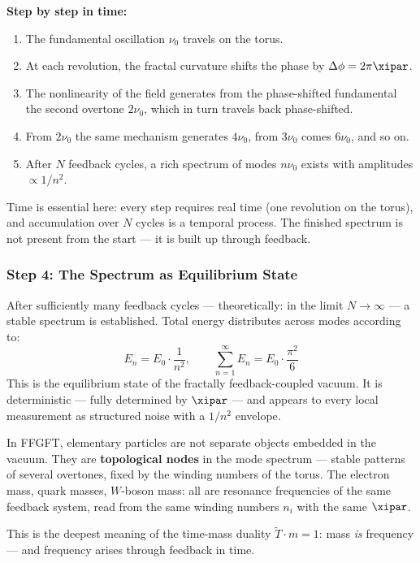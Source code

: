 \begin{keypoint}
\textbf{Step by step in time:}
\begin{enumerate}
    \item The fundamental oscillation $\nu_0$ travels on the torus.
    \item At each revolution, the fractal curvature shifts the phase by
    $\Delta\phi = 2\pi\xipar$.
    \item The nonlinearity of the field generates from the phase-shifted fundamental
    the second overtone $2\nu_0$, which in turn travels back phase-shifted.
    \item From $2\nu_0$ the same mechanism generates $4\nu_0$, from $3\nu_0$
    comes $6\nu_0$, and so on.
    \item After $N$ feedback cycles, a rich spectrum of modes $n\nu_0$ exists
    with amplitudes $\propto 1/n^2$.
\end{enumerate}
Time is essential here: every step requires real time (one revolution on the
torus), and accumulation over $N$ cycles is a temporal process. The finished
spectrum is not present from the start — it is built up through feedback.
\end{keypoint}

\subsubsection*{Step 4: The Spectrum as Equilibrium State}

After sufficiently many feedback cycles — theoretically: in the limit
$N \to \infty$ — a stable spectrum is established. Total energy distributes
across modes according to:
\begin{equation}
    E_n = E_0 \cdot \frac{1}{n^2}, \qquad \sum_{n=1}^{\infty} E_n = E_0 \cdot \frac{\pi^2}{6}
\end{equation}
This is the equilibrium state of the fractally feedback-coupled vacuum. It is
deterministic — fully determined by $\xipar$ — and appears to every local
measurement as structured noise with a $1/n^2$ envelope.

\begin{interpretation}
In FFGFT, elementary particles are not separate objects embedded in the vacuum.
They are \textbf{topological nodes} in the mode spectrum — stable patterns of
several overtones, fixed by the winding numbers of the torus. The electron mass,
quark masses, $W$-boson mass: all are resonance frequencies of the same feedback
system, read from the same winding numbers $n_i$ with the same $\xipar$.

This is the deepest meaning of the time-mass duality $\tilde{T} \cdot m = 1$:
mass \emph{is} frequency — and frequency arises through feedback in time.
\end{interpretation}


